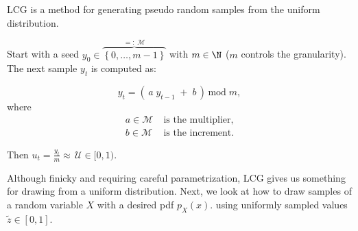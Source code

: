 \begin{frame}{\subsubsecname}

LCG is a method for generating pseudo random samples from the uniform distribution.

Start with a seed $y_0 \in \overbrace{\left\{0,\ldots,m-1\right\}}^{=:\;\mathcal{M}}$ with $m \in \N$ ($m$ controls the granularity). 
The next sample $y_t$ is computed as:

\begin{equation}
y_t = \left( \, a \; y_{t-1} \; + \; b \, \right) \, \text{mod} \; m,
\end{equation}
where\\[-0.7cm]
\begin{align*}
a \in \mathcal{M}&\; \text{is the multiplier,} \\
b \in \mathcal{M}&\; \text{is the increment.}
\end{align*}

Then $u_t = \frac{y_t}{m} \approx \,\mathcal{U} \in \lbrack0, 1)$.

\pause


\end{frame}

\begin{frame}

Although finicky and requiring careful parametrization, LCG gives us something for drawing from a uniform distribution. 
\svspace{5mm}
Next, we look at how to draw samples of a random variable $X$ with a desired pdf $p_X(x)$. 
using uniformly sampled values $\tilde z \in [0,1]$.

\end{frame}

